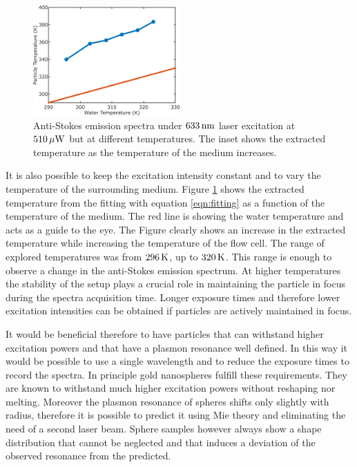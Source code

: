 \begin{figure}[htp] \centering
\includegraphics[width=0.50\textwidth]{Chapters/04_Anti-Stokes/Figures/04_Extracted_Temp/04_extracted_temp.png}
\caption{Anti-Stokes emission spectra under $633\,\textrm{nm}$ laser excitation at
$510\,\mu\textrm{W}$ but at different temperatures. The inset shows the extracted
temperature as the temperature of the medium increases.}
	\label{fig:AS-temps-rods}
\end{figure}

It is also possible to keep the excitation intensity constant and to vary the
temperature of the surrounding medium. Figure \ref{fig:AS-temps-rods} shows the
extracted temperature from the fitting with equation \ref{eqn:fitting} as a
function of the temperature of the medium. The red line is showing the water
temperature and acts as a guide to the eye. The Figure clearly shows an increase in the extracted temperature while
increasing the temperature of the flow cell. The range of explored
temperatures was from $296\,\textrm{K}$, up to $320\,\textrm{K}$. This range is
enough to observe a change in the anti-Stokes emission spectrum. At higher
temperatures the stability of the setup plays a crucial role in maintaining the
particle in focus during the spectra acquisition time. Longer exposure times and
therefore lower excitation intensities can be obtained if particles are actively
maintained in focus.

It would be beneficial therefore to have particles that can withstand higher
excitation powers and that have a plasmon resonance well defined. In this way it
would be possible to use a single wavelength and to reduce the exposure times to
record the spectra. In principle gold nanospheres fulfill these requirements.
They are known to withstand much higher excitation powers without reshaping nor
melting\cite{Hou2015}. Moreover the plasmon resonance of spheres shifts only
slightly with radius, therefore it is possible to predict it using Mie theory
and eliminating the need of a second laser beam. Sphere samples however always
show a shape distribution that cannot be neglected\cite{Lee2013} and that
induces a deviation of the observed resonance from the predicted.

